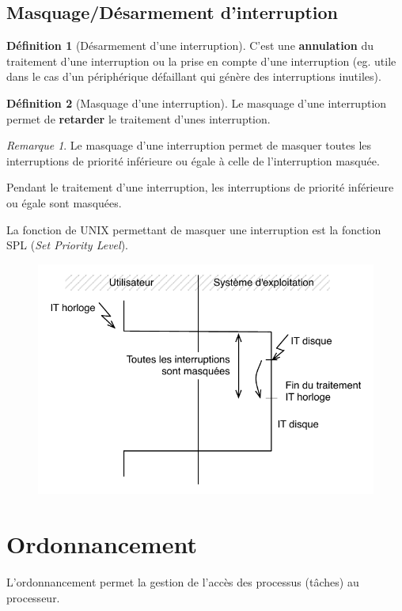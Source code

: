 \documentclass[11pt,english,french]{scrreprt}
\theoremstyle{remark}
\newtheorem*{rem*}{Remarque}
\theoremstyle{definition}
\newtheorem*{def*}{Définition}
\begin{document}
\section{Masquage/Désarmement d'interruption} %
\begin{def*}[Désarmement d'une interruption]
	C'est une \textbf{annulation} du traitement d'une interruption ou la prise en compte d'une interruption (eg. utile dans le cas d'un périphérique défaillant qui génère des interruptions inutiles).
\end{def*}

\begin{def*}[Masquage d'une interruption]
	Le masquage d'une interruption permet de \textbf{retarder} le traitement d'unes interruption.
	\begin{rem*}
		Le masquage d'une interruption permet de masquer toutes les interruptions de priorité inférieure ou égale à celle de l'interruption  masquée.
	\end{rem*}
\end{def*}

Pendant le traitement d'une interruption, les interruptions de priorité inférieure ou égale sont masquées.

La fonction de UNIX permettant de masquer une interruption est la fonction  SPL (\emph{Set Priority Level}).
\begin{figure}[h!]
	\center
	\includegraphics[scale=.6]{img/interruptions-masquees}
\end{figure}

\chapter{Ordonnancement} %
L'ordonnancement permet la gestion de l'accès des processus (tâches) au processeur.
\end{document}
